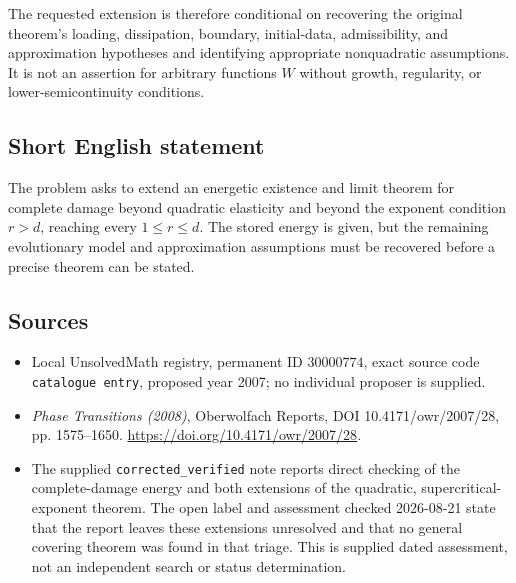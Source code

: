 \documentclass[11pt]{article}
\begin{document}
The requested extension is therefore conditional on recovering the original theorem's loading, dissipation, boundary, initial-data, admissibility, and approximation hypotheses and identifying appropriate nonquadratic assumptions. It is not an assertion for arbitrary functions \(W\) without growth, regularity, or lower-semicontinuity conditions.
\subsection{Short English statement}
The problem asks to extend an energetic existence and limit theorem for complete damage beyond quadratic elasticity and beyond the exponent condition \(r>d\), reaching every \(1\leq r\leq d\). The stored energy is given, but the remaining evolutionary model and approximation assumptions must be recovered before a precise theorem can be stated.
\subsection{Sources}
\begin{itemize}
\item Local UnsolvedMath registry, permanent ID \(30000774\), exact source code \texttt{catalogue entry}, proposed year 2007; no individual proposer is supplied.
\item \emph{Phase Transitions (2008)}, Oberwolfach Reports, DOI 10.4171/owr/2007/28, pp. 1575--1650. \url{https://doi.org/10.4171/owr/2007/28}.
\item The supplied \texttt{corrected\_verified} note reports direct checking of the complete-damage energy and both extensions of the quadratic, supercritical-exponent theorem. The open label and assessment checked 2026-08-21 state that the report leaves these extensions unresolved and that no general covering theorem was found in that triage. This is supplied dated assessment, not an independent search or status determination.
\end{itemize}
\end{document}
